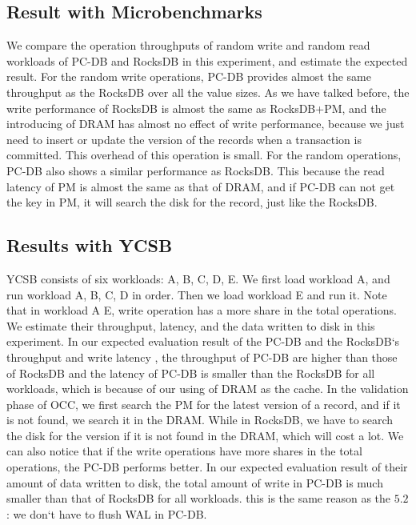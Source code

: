 \subsection{Result with Microbenchmarks}
We compare the operation throughputs of random write and random read workloads of PC-DB and RocksDB in this experiment, and estimate the expected result.
For the random write operations, PC-DB provides almost the same throughput as the RocksDB over all the value sizes. As we have talked before, the write performance of RocksDB is almost the same as RocksDB+PM, and the introducing of DRAM has almost no effect of write performance, because we just need to insert or update the version of the records when a transaction is committed. This overhead of this operation is small. 
For the random operations, PC-DB also shows a similar performance as RocksDB. This because the read latency of PM is almost the same as that of DRAM, and if PC-DB can not get the key in PM, it will search the disk for the record, just like the RocksDB.

\subsection{Results with YCSB}
YCSB consists of six workloads: A, B, C, D, E. We first load workload A, and run workload A, B, C, D in order. Then we load workload E and run it. Note that in workload A E, write operation has a more share in the total operations. We estimate their throughput, latency, and the data written to disk in this experiment.
In our expected evaluation result of the PC-DB and the RocksDB`s throughput and write latency , the throughput of PC-DB are higher than those of RocksDB and the latency of PC-DB is smaller than the RocksDB for all workloads, which is because of our using of DRAM as the cache. In the validation phase of OCC, we first search the PM for the latest version of a record, and if it is not found, we search it in the DRAM. While in RocksDB, we have to search the disk for the version if it is not found in the DRAM, which will cost a lot. We can also notice that if the write operations have more shares in the total operations, the PC-DB performs better.
In our expected evaluation result of their amount of data written to disk, the total amount of write in PC-DB is much smaller than that of RocksDB for all workloads. this is the same reason as the $5.2$: we don`t have to flush WAL in PC-DB.